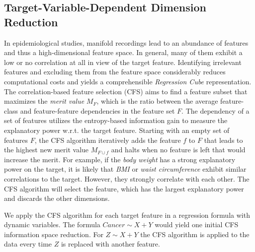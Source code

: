 \documentclass[journal]{style/vgtc} 			          %
\begin{document}
\subsection{Target-Variable-Dependent Dimension Reduction}
In epidemiological studies, manifold recordings lead to an abundance of features and thus a high-dimensional feature space.
In general, many of them exhibit a low or no correlation at all in view of the target feature.
Identifying irrelevant features and excluding them from the feature space considerably reduces computational costs and yields a comprehensible \emph{Regression Cube} representation.
The correlation-based feature selection (CFS) \cite{CFS} aims to find a feature subset that maximizes the \emph{merit value} $M_F$, which is the ratio between the average feature-class and feature-feature dependencies in the feature set $F$.
The dependency of a set of features utilizes the entropy-based information gain to measure the explanatory power w.r.t. the target feature.
Starting with an empty set of features $F$, the CFS algorithm iteratively adds the feature $f$ to $F$ that leads to the highest new merit value $M_{F\cup f}$ and halts when no feature is left that would increase the merit.
For example, if the \emph{body weight} has a strong explanatory power on the target, it is likely that \emph{BMI} or \emph{waist circumference} exhibit similar correlations to the target.
However, they strongly correlate with each other.
The CFS algorithm will select the feature, which has the largest explanatory power and discards the other dimensions.

We apply the CFS algorithm for each target feature in a regression formula with dynamic variables.
The formula $Cancer \sim X + Y$ would yield one initial CFS information space reduction.
For $Z \sim X + Y$ the CFS algorithm is applied to the data every time $Z$ is replaced with another feature.
\end{document}
